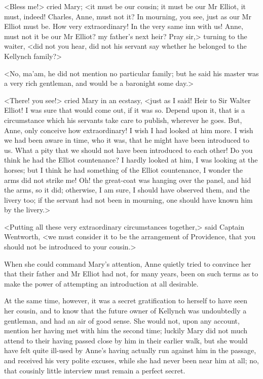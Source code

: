 <Bless me!> cried Mary; <it must be our cousin; it must be our Mr Elliot, it must, indeed! Charles, Anne, must not it? In mourning, you see, just as our Mr Elliot must be. How very extraordinary! In the very same inn with us! Anne, must not it be our Mr Elliot? my father's next heir? Pray sir,> turning to the waiter, <did not you hear, did not his servant say whether he belonged to the Kellynch family?>

<No, ma'am, he did not mention no particular family; but he said his master was a very rich gentleman, and would be a baronight some day.>

<There! you see!> cried Mary in an ecstasy, <just as I said! Heir to Sir Walter Elliot! I was sure that would come out, if it was so. Depend upon it, that is a circumstance which his servants take care to publish, wherever he goes. But, Anne, only conceive how extraordinary! I wish I had looked at him more. I wish we had been aware in time, who it was, that he might have been introduced to us. What a pity that we should not have been introduced to each other! Do you think he had the Elliot countenance? I hardly looked at him, I was looking at the horses; but I think he had something of the Elliot countenance, I wonder the arms did not strike me! Oh! the great-coat was hanging over the panel, and hid the arms, so it did; otherwise, I am sure, I should have observed them, and the livery too; if the servant had not been in mourning, one should have known him by the livery.>

<Putting all these very extraordinary circumstances together,> said Captain Wentworth, <we must consider it to be the arrangement of Providence, that you should not be introduced to your cousin.>

When she could command Mary's attention, Anne quietly tried to convince her that their father and Mr Elliot had not, for many years, been on such terms as to make the power of attempting an introduction at all desirable.

At the same time, however, it was a secret gratification to herself to have seen her cousin, and to know that the future owner of Kellynch was undoubtedly a gentleman, and had an air of good sense. She would not, upon any account, mention her having met with him the second time; luckily Mary did not much attend to their having passed close by him in their earlier walk, but she would have felt quite ill-used by Anne's having actually run against him in the passage, and received his very polite excuses, while she had never been near him at all; no, that cousinly little interview must remain a perfect secret.

